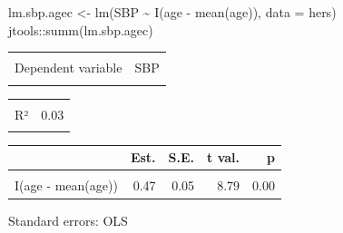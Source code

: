 \documentclass[
  letterpaper,
  DIV=11,
  numbers=noendperiod]{scrreport}
\newenvironment{Shaded}{\begin{snugshade}}{\end{snugshade}}
\newcommand{\AttributeTok}[1]{\textcolor[rgb]{0.40,0.45,0.13}{#1}}
\newcommand{\FunctionTok}[1]{\textcolor[rgb]{0.28,0.35,0.67}{#1}}
\newcommand{\NormalTok}[1]{\textcolor[rgb]{0.00,0.23,0.31}{#1}}
\newcommand{\OtherTok}[1]{\textcolor[rgb]{0.00,0.23,0.31}{#1}}
\newcommand{\SpecialCharTok}[1]{\textcolor[rgb]{0.37,0.37,0.37}{#1}}
\begin{document}
\begin{Shaded}
\begin{Highlighting}[]
\NormalTok{lm.sbp.agec }\OtherTok{\textless{}{-}} \FunctionTok{lm}\NormalTok{(SBP }\SpecialCharTok{\textasciitilde{}} \FunctionTok{I}\NormalTok{(age }\SpecialCharTok{{-}} \FunctionTok{mean}\NormalTok{(age)), }\AttributeTok{data =}\NormalTok{ hers)}
\NormalTok{jtools}\SpecialCharTok{::}\FunctionTok{summ}\NormalTok{(lm.sbp.agec)}
\end{Highlighting}
\end{Shaded}

\begin{table}[!h]
\centering
\begin{tabular}{lr}
\toprule
\cellcolor{gray!6}{Observations} & \cellcolor{gray!6}{2763}\\
Dependent variable & SBP\\
\cellcolor{gray!6}{Type} & \cellcolor{gray!6}{OLS linear regression}\\
\bottomrule
\end{tabular}
\end{table} \begin{table}[!h]
\centering
\begin{tabular}{lr}
\toprule
\cellcolor{gray!6}{F(1,2761)} & \cellcolor{gray!6}{77.21}\\
R² & 0.03\\
\cellcolor{gray!6}{Adj. R²} & \cellcolor{gray!6}{0.03}\\
\bottomrule
\end{tabular}
\end{table} \begin{table}[!h]
\centering
\begin{threeparttable}
\begin{tabular}{lrrrr}
\toprule
  & Est. & S.E. & t val. & p\\
\midrule
\cellcolor{gray!6}{(Intercept)} & \cellcolor{gray!6}{135.07} & \cellcolor{gray!6}{0.36} & \cellcolor{gray!6}{378.24} & \cellcolor{gray!6}{0.00}\\
I(age - mean(age)) & 0.47 & 0.05 & 8.79 & 0.00\\
\bottomrule
\end{tabular}
\begin{tablenotes}
\item Standard errors: OLS
\end{tablenotes}
\end{threeparttable}
\end{table}
\end{document}
